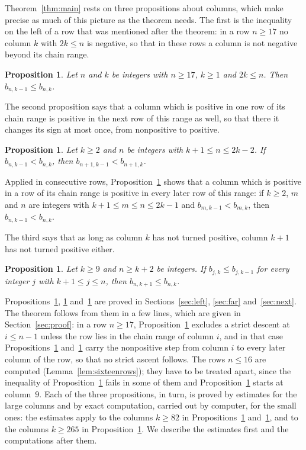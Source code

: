 \documentclass{amsart}
\newtheorem{proposition}[theorem]{Proposition}
\theoremstyle{definition}
\theoremstyle{remark}
\numberwithin{equation}{section}
\begin{document}
Theorem~\ref{thm:main} rests on three propositions about columns, which make precise as much of this picture as the theorem needs. The first is the inequality on the left of a row that was mentioned after the theorem: in a row $n\ge 17$ no column $k$ with $2k\le n$ is negative, so that in these rows a column is not negative beyond its chain range.

\begin{proposition}\label{prop:leftpart}
Let $n$ and $k$ be integers with $n\ge 17$, $k\ge 1$ and $2k\le n$. Then $b_{n,k-1}\le b_{n,k}$.
\end{proposition}

The second proposition says that a column which is positive in one row of its chain range is positive in the next row of this range as well, so that there it changes its sign at most once, from nonpositive to positive.

\begin{proposition}\label{prop:chainrange}
Let $k\ge 2$ and $n$ be integers with $k+1\le n\le 2k-2$. If $b_{n,k-1}<b_{n,k}$, then $b_{n+1,k-1}<b_{n+1,k}$.
\end{proposition}

Applied in consecutive rows, Proposition~\ref{prop:chainrange} shows that a column which is positive in a row of its chain range is positive in every later row of this range: if $k\ge 2$, $m$ and $n$ are integers with $k+1\le m\le n\le 2k-1$ and $b_{m,k-1}<b_{m,k}$, then $b_{n,k-1}<b_{n,k}$.

The third says that as long as column $k$ has not turned positive, column $k+1$ has not turned positive either.

\begin{proposition}\label{prop:nextcolumn}
Let $k\ge 9$ and $n\ge k+2$ be integers. If $b_{j,k}\le b_{j,k-1}$ for every integer $j$ with $k+1\le j\le n$, then $b_{n,k+1}\le b_{n,k}$.
\end{proposition}

Propositions~\ref{prop:leftpart}, \ref{prop:chainrange} and~\ref{prop:nextcolumn} are proved in Sections~\ref{sec:left}, \ref{sec:far} and~\ref{sec:next}. The theorem follows from them in a few lines, which are given in Section~\ref{sec:proof}: in a row $n\ge 17$, Proposition~\ref{prop:leftpart} excludes a strict descent at $i\le n-1$ unless the row lies in the chain range of column $i$, and in that case Propositions~\ref{prop:chainrange} and~\ref{prop:nextcolumn} carry the nonpositive step from column $i$ to every later column of the row, so that no strict ascent follows. The rows $n\le 16$ are computed (Lemma~\ref{lem:sixteenrows}); they have to be treated apart, since the inequality of Proposition~\ref{prop:leftpart} fails in some of them and Proposition~\ref{prop:nextcolumn} starts at column~$9$. Each of the three propositions, in turn, is proved by estimates for the large columns and by exact computation, carried out by computer, for the small ones: the estimates apply to the columns $k\ge 82$ in Propositions~\ref{prop:leftpart} and~\ref{prop:chainrange}, and to the columns $k\ge 265$ in Proposition~\ref{prop:nextcolumn}. We describe the estimates first and the computations after them.
\end{document}
